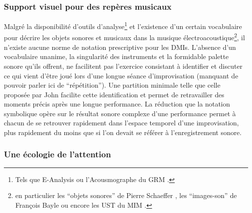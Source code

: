 \subsubsection{Support visuel pour des repères musicaux}

\noindent Malgré la disponibilité d'outils d'analyse\footnote{Tels que E-Analysis \cite{couprie_eanalysis:_2016} ou l'Acousmographe du \gls{GRM} \cite{favreau_lacousmographe_2010}.} et l'existence d'un certain vocabulaire pour décrire les objets sonores et musicaux dans la musique électroacoustique\footnote{en particulier les ``objets sonores'' de Pierre Schaeffer \cite{schaeffer_traite_1966}, les ``images-son'' de François Bayle \cite{bayle_musique_1993} ou encore les \gls{UST} du \gls{MIM} \cite{delalande_les_1996}.}, il n'existe aucune norme de notation prescriptive pour les \glspl{DMI}. L'absence d'un vocabulaire unanime, la singularité des instruments et la formidable palette sonore qu'ils offrent, ne facilitent pas l'exercice consistant à identifier et discuter ce qui vient d'être joué lors d'une longue séance d'improvisation (manquant de pouvoir parler ici de ``répétition''). Une partition minimale telle que celle proposée par John facilite cette identification et permet de retravailler des moments précis après une longue performance. La réduction que la notation symbolique opère sur le résultat sonore complexe d'une performance permet à chacun de se retrouver rapidement dans l'espace temporel d'une improvisation, plus rapidement du moins que si l'on devait se référer à l'enregistrement sonore.

\subsubsection{Une écologie de l'attention}

